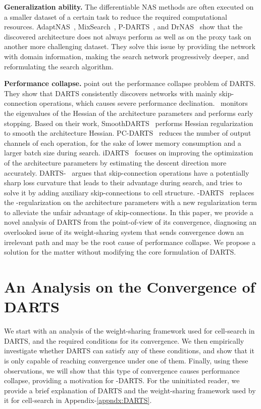 \documentclass{article} \usepackage{fancyhdr, iclr2023_conference, times}
\newcommand{\mydarts}{-DARTS\xspace}
\begin{document}
\textbf{Generalization ability.} The differentiable NAS methods are often executed on a smaller dataset of a certain task to reduce the required computational resources. AdaptNAS~\citep{DBLP:conf/nips/LiYW020}, MixSearch~\citep{DBLP:journals/corr/abs-2102-13280}, P-DARTS~\citep{DBLP:journals/ijcv/ChenXWT21}, and DrNAS~\citep{DBLP:conf/iclr/ChenWCTH21} show that the discovered architecture does not always perform as well as on the proxy task on another more challenging dataset. They solve this issue by providing the network with domain information, making the search network progressively deeper, and reformulating the search algorithm.
\par \textbf{Performance collapse.} \citet{DBLP:conf/iclr/ZelaESMBH20,DBLP:conf/iclr/ChuW0LWY21} point out the performance collapse problem of DARTS. They show that DARTS consistently discovers networks with mainly skip-connection operations, which causes severe performance declination.~\citet{DBLP:conf/iclr/ZelaESMBH20} monitors the eigenvalues of the Hessian of the architecture parameters and performs early stopping. Based on their work, SmoothDARTS~\citep{DBLP:conf/icml/ChenH20} performs Hessian regularization to smooth the architecture Hessian. PC-DARTS~\citep{DBLP:conf/iclr/XuX0CQ0X20} reduces the number of output channels of each operation, for the sake of lower memory consumption and a larger batch size during search. iDARTS~\citep{DBLP:conf/icml/ZhangSPCAH21} focuses on improving the optimization of the architecture parameters by estimating the descent direction more accurately. DARTS-~\citep{DBLP:conf/iclr/ChuW0LWY21} argues that skip-connection operations have a potentially sharp loss curvature that leads to their advantage during search, and tries to solve it by adding auxiliary skip-connections to cell structure. -DARTS~\citep{DBLP:journals/corr/abs-2203-01665} replaces the -regularization on the architecture parameters with a new regularization term to alleviate the unfair advantage of skip-connections. 
In this paper, we provide a novel analysis of DARTS from the point-of-view of its convergence, diagnosing an overlooked issue of its weight-sharing system that sends convergence down an irrelevant path and may be the root cause of performance collapse. We propose a solution for the matter without modifying the core formulation of DARTS.

\section{An Analysis on the Convergence of DARTS}
We start with an analysis of the weight-sharing framework used for cell-search in DARTS, and the required conditions for its convergence. We then empirically investigate whether DARTS can satisfy any of these conditions, and show that it is only capable of reaching convergence under one of them. Finally, using these observations, we will show that this type of convergence causes performance collapse, providing a motivation for \mydarts. For the uninitiated reader, we provide a brief explanation of DARTS and the weight-sharing framework used by it for cell-search in Appendix-\ref{appndx:DARTS}.
\end{document}
